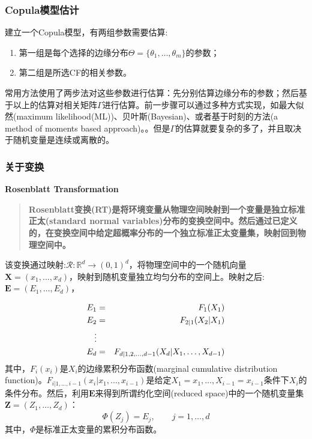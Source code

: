 \subsubsection{Copula模型估计}
建立一个Copula模型，有两组参数需要估算:
\begin{enumerate}
    \item 第一组是每个选择的边缘分布$\Theta = \{\theta_1,\dots,\theta_m\}$的参数；
    \item 第二组是所选CF的相关参数。
\end{enumerate}
常用方法使用了两步法对这些参数进行估算：先分别估算边缘分布的参数；然后基于以上的估算对相关矩阵$\Gamma$进行估算。前一步骤可以通过多种方式实现，如最大似然(maximum likelihood(ML))、贝叶斯(Bayesian)、或者基于时刻的方法(a method of moments based approach)。。但是$\Gamma$的估算就要复杂的多了，并且取决于随机变量是连续或离散的。

\subsubsection{关于变换}
\textbf{\textcolor[rgb]{1,0,0}{Rosenblatt Transformation}}
\begin{quotation}
    \textbf{\textcolor[rgb]{1,0,0}{Rosenblatt变换(RT)是将环境变量从物理空间映射到一个变量是独立标准正太(standard normal variables)分布的变换空间中。然后通过已定义的，在变换空间中给定超概率分布的一个独立标准正太变量集，映射回到物理空间中。}}\cite{Montes2015}
\end{quotation}


该变换通过映射:$\mathcal{R}: \mathbb{R}^d \rightarrow (0,1)^d$，将物理空间中的一个随机向量$\mathbf{X}=(x_1,\dots,x_d)$，映射到随机变量独立均匀分布的空间上。映射之后:$\mathbf{E} = (E_1,\dots,E_d)$\cite{Montes2015}，

\begin{eqnarray}
    E_1 &=& F_1(X_1)  \notag \\
    E_2 &=& F_{2|1}(X_2|X_1) \notag \\
    \vdots \\
    E_d &=& F_{d|1,2,\dots,d-1} (X_d | X_1,\dots,X_{d-1}) \notag
    \label{eq-rosenblatt}
\end{eqnarray}
其中，$F_i(x_i)$是$X_i$的\textcolor[rgb]{1,0,0}{边缘累积分布函数(marginal cumulative distribution function)}。$F_{i|1,\dots,i-1}(x_i|x_1,\dots,x_{i-1})$是给定$X_1 = x_1,\dots,X_{i-1}=x_{i-1}$条件下$X_i$的条件分布。然后，利用$\mathbf{E}$来得到所谓\textcolor[rgb]{1,0,0}{约化空间(reduced space)}中的一个随机变量集$\mathbf{Z} = (Z_1,\dots,Z_d)$：
\begin{equation}
    \Phi (Z_j) = E_j, \qquad j=1,\dots,d
    \label{eq-cdf}
\end{equation}
其中，$\Phi$是标准正太变量的累积分布函数。


